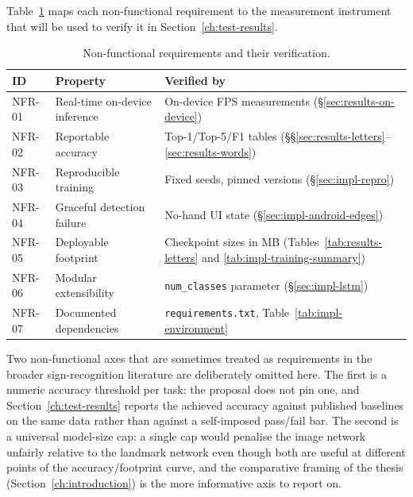 Table~\ref{tab:design-nfr} maps each non-functional requirement to
the measurement instrument that will be used to verify it in
Section~\ref{ch:test-results}.

\begin{table}[!ht]
\centering
\caption{Non-functional requirements and their verification.}
\label{tab:design-nfr}
\small
\begin{tabular}{lp{4.0cm}p{6.0cm}}
\toprule
\textbf{ID} & \textbf{Property} & \textbf{Verified by} \\
\midrule
NFR-01 & Real-time on-device inference     & On-device FPS measurements (\S\ref{sec:results-on-device}) \\
NFR-02 & Reportable accuracy               & Top-1/Top-5/F1 tables (\S\S\ref{sec:results-letters}--\ref{sec:results-words}) \\
NFR-03 & Reproducible training             & Fixed seeds, pinned versions (\S\ref{sec:impl-repro}) \\
NFR-04 & Graceful detection failure        & No-hand UI state (\S\ref{sec:impl-android-edges}) \\
NFR-05 & Deployable footprint              & Checkpoint sizes in MB (Tables~\ref{tab:results-letters} and \ref{tab:impl-training-summary}) \\
NFR-06 & Modular extensibility             & \texttt{num\_classes} parameter (\S\ref{sec:impl-lstm}) \\
NFR-07 & Documented dependencies           & \texttt{requirements.txt}, Table~\ref{tab:impl-environment} \\
\bottomrule
\end{tabular}
\end{table}

Two non-functional axes that are sometimes treated as requirements
in the broader sign-recognition literature are deliberately omitted
here. The first is a numeric accuracy threshold per task: the
proposal does not pin one, and Section~\ref{ch:test-results} reports
the achieved accuracy against published baselines on the same data
rather than against a self-imposed pass/fail bar. The second is a
universal model-size cap: a single cap would penalise the image
network unfairly relative to the landmark network even though both
are useful at different points of the accuracy/footprint curve, and
the comparative framing of the thesis (Section~\ref{ch:introduction})
is the more informative axis to report on.

